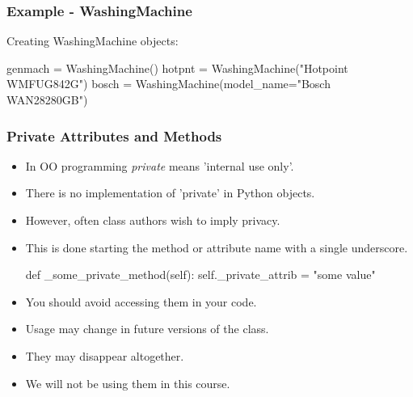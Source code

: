 \documentclass{beamer}
\begin{document}
\begin{frame}[fragile]
\frametitle{Example - WashingMachine}
Creating WashingMachine objects:
\begin{code}
genmach = WashingMachine()
hotpnt = WashingMachine("Hotpoint WMFUG842G")
bosch = WashingMachine(model_name="Bosch WAN28280GB")
\end{code}
\end{frame}

\begin{frame}[fragile]
\frametitle{Private Attributes and Methods}

\begin{itemize}
\item In OO programming \emph{private} means 'internal use only'.
\item There is no implementation of 'private' in Python objects.
\item However, often class authors wish to imply privacy.
\item This is done starting the method or attribute name with a single underscore.
\begin{code}
  def _some_private_method(self):
    self._private_attrib = "some value"
\end{code}

\item You should avoid accessing them in your code.
\item Usage may change in future versions of the class.
\item They may disappear altogether.
\item We will not be using them in this course.
\end{itemize}

\end{frame}
\end{document}
